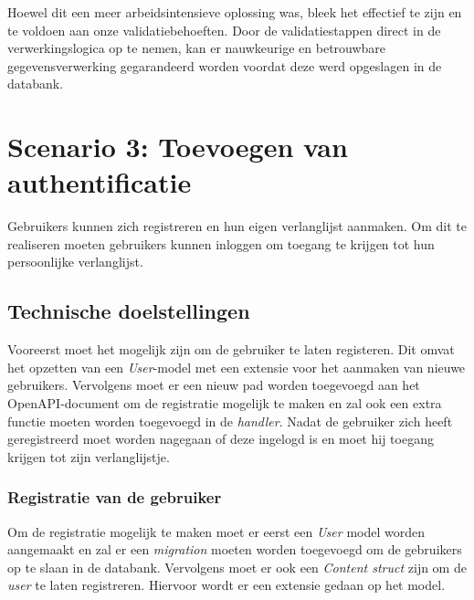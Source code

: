 Hoewel dit een meer arbeidsintensieve oplossing was, bleek het effectief te zijn en te voldoen aan onze validatiebehoeften. Door de validatiestappen direct in de verwerkingslogica op te nemen, kan er nauwkeurige en betrouwbare gegevensverwerking gegarandeerd worden voordat deze werd opgeslagen in de databank.


 \newpage

\section{Scenario 3: Toevoegen van authentificatie}
Gebruikers kunnen zich registreren en hun eigen verlanglijst aanmaken. Om dit te realiseren moeten gebruikers kunnen inloggen om toegang te krijgen tot hun persoonlijke verlanglijst. 

\subsection{Technische doelstellingen}
Vooreerst moet het mogelijk zijn om de gebruiker te laten registeren. Dit omvat het opzetten van een \textit{User}-model met een extensie voor het aanmaken van nieuwe gebruikers. Vervolgens moet er een nieuw pad worden toegevoegd aan het OpenAPI-document om de registratie mogelijk te maken en zal ook een extra functie moeten worden toegevoegd in de \textit{handler}. 
Nadat de gebruiker zich heeft geregistreerd moet worden nagegaan of deze ingelogd is en moet hij toegang krijgen tot zijn verlanglijstje. 
 
 \subsubsection{Registratie van de gebruiker}
Om de registratie mogelijk te maken moet er eerst een \textit{User} model worden aangemaakt en zal er een \textit{migration} moeten worden toegevoegd om de gebruikers op te slaan in de databank. Vervolgens moet er ook een \textit{Content struct} zijn om de \textit{user} te laten registreren. Hiervoor wordt er een extensie gedaan op het model. 

